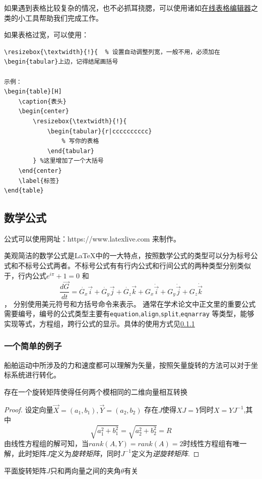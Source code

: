 如果遇到表格比较复杂的情况，也不必抓耳挠腮，可以使用诸如\href{http://www.tablesgenerator.com}{在线表格编辑器}之类的小工具帮助我们完成工作。

如果表格过宽，可以使用：
\begin{verbatim}
\resizebox{\textwidth}{!}{  % 设置自动调整列宽，一般不用，必须加在\begin{tabular}上边，记得结尾画括号

示例：
\begin{table}[H]
	\caption{表头}
	\begin{center}
		\resizebox{\textwidth}{!}{
			\begin{tabular}{r|cccccccccc}
				% 写你的表格
			\end{tabular}
		} %这里增加了一个大括号
	\end{center}
	\label{标签}
\end{table}

\end{verbatim}

\subsection{数学公式}

公式可以使用网址：https://www.latexlive.com 来制作。

美观简洁的数学公式是\LaTeX 中的一大特点，按照数学公式的类型可以分为标号公式和不标号公式两者。不标号公式有有行内公式和行间公式的两种类型分别类似于，行内公式$ e^{i\pi}+1=0 $ 和\[ \dfrac{d\vec{G}}{dt}=\dot{G_x}\vec{i}+\dot{G_y}\vec{j}+\dot{G_z}\vec{k}+G_x\dot{\vec{i}}+G_y\dot{\vec{j}}+G_z\dot{\vec{k}} \]，
分别使用美元符号和方括号命令来表示。 通常在学术论文中正文里的重要公式需要编号，编号的公式类型主要有\verb|equation|,\verb|align|,\verb|split|,\verb|eqnarray| 等类型，能够实现等式，方程组，跨行公式的显示。具体的使用方式见\ref{example}
\subsubsection{一个简单的例子}\label{example}
船舶运动中所涉及的力和速度都可以理解为矢量，按照矢量旋转的方法可以对于坐标系统进行转化。
\begin{lemma}
\label{2Drot} 
存在一个旋转矩阵使得任何两个模相同的二维向量相互转换
\end{lemma}
\begin{proof}
设定向量$\vec{X}=(a_1,b_1),\vec{Y}=(a_2,b_2)$ 存在$ J $使得$ XJ=Y $同时$X=YJ^{-1}$,其中\[  \sqrt{a_1^{2}+b_1^{2}}=\sqrt{a_2^{2}+b_2^{2}}=R \] 
由线性方程组的解可知，当$rank(A,Y)=rank(A)=2$时线性方程组有唯一解，此时矩阵$ J $定义为\textit{旋转矩阵}，同时$ J^{-1} $定义为\textit{逆旋转矩阵}.
\end{proof}
\begin{theorem}
\label{rotM}
平面旋转矩阵$ J $只和两向量之间的夹角$ \theta $有关
\end{theorem}

